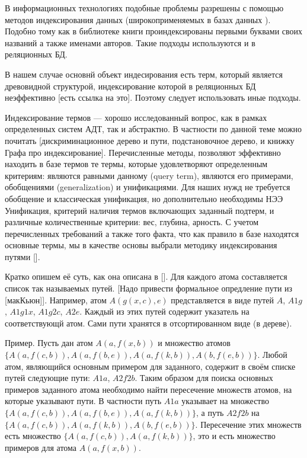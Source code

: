 В информационных технологиях подобные проблемы разрешены с помощью методов индексирования данных (широкоприменяемых в базах данных \cite{Ulman}). Подобно тому как в библиотеке книги проиндексированы первыми буквами своих названий а также именами авторов. Такие подходы используются и в реляционных БД. 

В нашем случае основнй объект индесирования есть терм, который является древовидной структурой, индексирование которой в реляционных БД неэффективно [есть ссылка на это]. Поэтому следует использовать иные подходы. 

Индексирование термов --- хорошо исследованный вопрос, как в рамках определенных систем АДТ, так и абстрактно. В частности по данной теме можно почитать [дискриминационное дерево и пути, подстановочное дерево, и книжку Графа про индексирование]. 
Перечисленные методы, позволяют эффективно находить в базе термов те термы, которые удовлетворяют определенным критериям: являются равными данному (query term), являются его примерами, обобщениями (generalization) и унификациями. 
Для наших нужд не требуется обобщение и классическая унификация, но дополнительно необходимы НЭЭ Унификация, критерий наличия термов включающих заданный подтерм, и различные количественные критерии: вес, глубина, арность. С учетом перечисленных требований а также того факта, что как правило в базе находятся основные термы, мы в качестве основы выбрали методику индексирования путями [].

Кратко опишем её суть, как она описана в []. Для каждого атома составляется список так называемых путей. [Надо привести формальное опредление пути из [макКьюн]]. Например, атом $A(g(x,c),e)$ представляется в виде путей $A$, $A1g$, $A1g1x$, $A1g2c$, $A2e$. Каждый из этих путей содержит указатель на соответствующй атом. Сами пути хранятся в отсортированном виде (в дереве). 

Пример. Пусть дан атом $A(a,f(x,b))$ и множество атомов $\{A(a,f(c,b)), A(a,f(b,e)),A(a,f(k,b)), A(b,f(e,b))\}$. Любой атом, являющийся основным примером для заданного, содержит в своём списке путей следующие пути: $A1a$, $A2f2b$. Таким образом для поиска основных примеров заданного атома необходимо найти пересечение множеств атомов, на которые указывают пути.  В частности путь $A1a$ указывает на множество $\{A(a,f(c,b)), A(a,f(b,e)),A(a,f(k,b))\}$, а путь $A2f2b$ на $\{A(a,f(c,b)), A(a,f(k,b)), A(b,f(e,b))\}$. Пересечение этих множеств есть множество $\{A(a,f(c,b)),A(a,f(k,b))\}$, это и есть множество примеров для атома $A(a,f(x,b))$.

